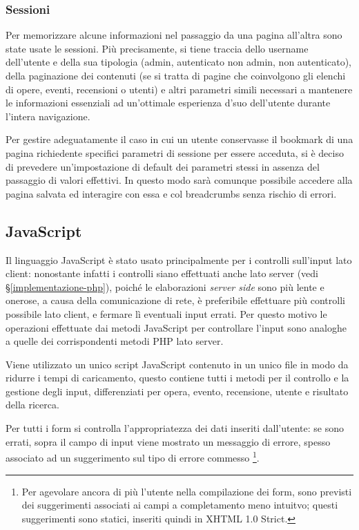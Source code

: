 \subsubsection{Sessioni}
\label{implementazione-php-sessioni}
Per memorizzare alcune informazioni nel passaggio da una pagina all'altra sono state usate le sessioni. Più precisamente, si tiene traccia dello username dell'utente e della sua tipologia (admin, autenticato non admin, non autenticato), della paginazione dei contenuti (se si tratta di pagine che coinvolgono gli elenchi di opere, eventi, recensioni o utenti) e altri parametri simili necessari a mantenere le informazioni essenziali ad un'ottimale esperienza d'suo dell'utente durante l'intera navigazione.

Per gestire adeguatamente il caso in cui un utente conservasse il bookmark di una pagina richiedente specifici parametri di sessione per essere acceduta, si è deciso di prevedere un'impostazione di default dei parametri stessi in assenza del passaggio di valori effettivi. In questo modo sarà comunque possibile accedere alla pagina salvata ed interagire con essa e col breadcrumbs senza rischio di errori.

\subsection{JavaScript}
\label{implementazione-javascript}
Il linguaggio JavaScript è stato usato principalmente per i controlli sull'input lato client: nonostante infatti i controlli siano effettuati anche lato server (vedi §\ref{implementazione-php}), poiché le elaborazioni \textit{server side} sono più lente e onerose, a causa della comunicazione di rete, è preferibile effettuare più controlli possibile lato client, e fermare lì eventuali input errati. Per questo motivo le operazioni effettuate dai metodi JavaScript per controllare l'input sono analoghe a quelle dei corrispondenti metodi PHP lato server.

Viene utilizzato un unico script JavaScript contenuto in un unico file in modo da ridurre i tempi di caricamento, questo contiene tutti i metodi per il controllo e la gestione degli input, differenziati per opera, evento, recensione, utente e risultato della ricerca.

Per tutti i form si controlla l'appropriatezza dei dati inseriti dall'utente: se sono errati, sopra il campo di input viene mostrato un messaggio di errore, spesso associato ad un suggerimento sul tipo di errore commesso \footnote{Per agevolare ancora di più l'utente nella compilazione dei form, sono previsti dei suggerimenti associati ai campi a completamento meno intuitvo; questi suggerimenti sono statici, inseriti quindi in XHTML 1.0 Strict.}.

